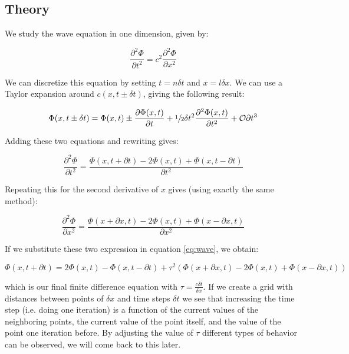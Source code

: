 \documentclass[11pt,a4paper,onecolumn]{article}
\begin{document}
\subsection{Theory}
We study the wave equation in one dimension, given by:

\begin{equation}
  \label{eq:wave}
  \frac{\partial^2 \Phi}{\partial t^2} = c^2 \frac{\partial^2 \Phi}{\partial x^2}
\end{equation}

We can discretize this equation by setting $t = n \delta t$ and $x = l \delta x$. We can use a Taylor expansion around $c(x,t\pm \delta t)$, giving the following result:

\begin{equation}
  \Phi(x,t\pm \delta t) = \Phi(x,t) \pm \frac{\partial \Phi(x,t)}{\partial t} + \sfrac{1}{2}\delta t^2 \frac{\partial^2 \Phi(x,t)}{\partial t^2} + \mathcal{O}{\partial t^3}
\end{equation}

Adding these two equations and rewriting gives:

\begin{equation}
  \frac{\partial^2 \Phi}{\partial t^2} = \frac{\Phi(x,t+\partial t) - 2\Phi(x,t) + \Phi(x,t-\partial t)}{\partial t^2}
\end{equation}

Repeating this for the second derivative of $x$ gives (using exactly the same method):

\begin{equation}
    \frac{\partial^2 \Phi}{\partial x^2} = \frac{\Phi(x+\partial x,t) - 2\Phi(x,t) + \Phi(x-\partial x,t)}{\partial x^2}
\end{equation}

If we substitute these two expression in equation \ref{eq:wave}, we obtain:

\begin{equation}
  \label{eq:disc}
  \Phi(x,t+\partial t) = 2\Phi(x,t) - \Phi(x,t-\partial t) + \tau^2(\Phi(x+\partial x,t) - 2\Phi(x,t) + \Phi(x-\partial x,t))
\end{equation}

which is our final finite difference equation with $\tau = \frac{c\delta t}{\delta x}$. If we create a grid with distances between points of $\delta x$ and time steps $\delta t$ we see that increasing the time step (i.e. doing one iteration) is a function of the current values of the neighboring points, the current value of the point itself, and the value of the point one iteration before. By adjusting the value of $\tau$ different types of behavior can be observed, we will come back to this later.
\end{document}
